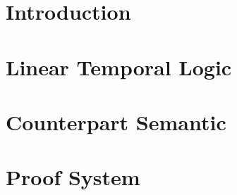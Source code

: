 \documentclass[a4paper,11pt]{report}
\begin{document}
\chapter{Introduction}


\chapter{Linear Temporal Logic}


\chapter{Counterpart Semantic}





\chapter{Proof System}

\end{document}
